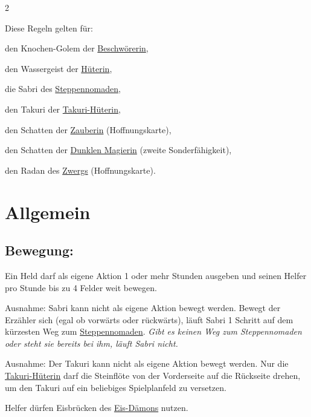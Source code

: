 \documentclass[10pt, a4paper, oneside]{book}
\newcommand{\fan}[1]{\textit{#1}}
\begin{document}
\begin{multicols*}{2}\raggedcolumns


\begin{nobgcolor}

Diese Regeln gelten für:

\bullet{} den Knochen-Golem der \hyperref[beschwoererin]{Beschwörerin},

\bullet{} den Wassergeist der \hyperref[hueterin]{Hüterin},

\bullet{} die Sabri des \hyperref[steppennomade]{Steppennomaden},

\bullet{} den Takuri der \hyperref[takuri-hueterin]{Takuri-Hüterin},

\bullet{} den Schatten der \hyperref[zauberin]{Zauberin} (Hoffnungskarte),

\bullet{} den Schatten der \hyperref[dunkle-magierin]{Dunklen Magierin} (zweite Sonderfähigkeit),

\bullet{} den Radan des \hyperref[zwerg]{Zwergs} (Hoffnungskarte).





\section{Allgemein}




\subsection{Bewegung:}


Ein Held darf als eigene Aktion 1 oder mehr Stunden ausgeben und seinen Helfer pro Stunde bis zu 4 Felder weit bewegen.\supercite{nh-begleitheft,dlh17-hoffnungskarte-zwerg,dunkle-eara-regelkarte}

Ausnahme: Sabri kann nicht als eigene Aktion bewegt werden. Bewegt der Erzähler sich (egal ob vorwärts oder rückwärts), läuft Sabri 1 Schritt auf dem kürzesten Weg zum \hyperref[steppennomade]{Steppennomaden}. \fan{Gibt es keinen Weg zum Steppennomaden oder steht sie bereits bei ihm, läuft Sabri nicht.}

Ausnahme: Der Takuri kann nicht als eigene Aktion bewegt werden. Nur die \hyperref[takuri-hueterin]{Takuri-Hüterin} darf die Steinflöte von der Vorderseite auf die Rückseite drehen, um den Takuri auf ein beliebiges Spielplanfeld zu versetzen.

Helfer dürfen Eisbrücken des \hyperref[eis-daemon]{Eis-Dämons} nutzen.
\supercite{88780}


\end{nobgcolor}
\end{multicols*}
\end{document}

